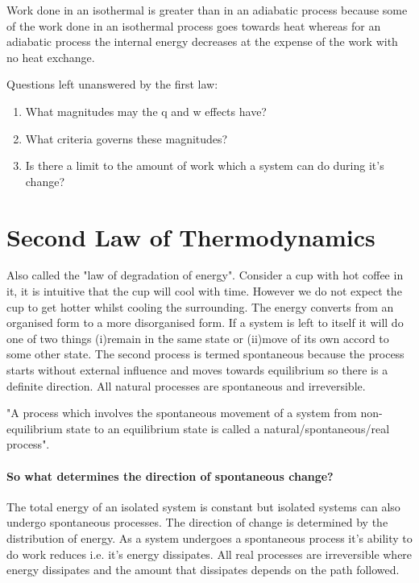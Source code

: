 \documentclass[12pt]{article}
\begin{document}
Work done in an isothermal is greater than in an adiabatic process because some of the work done in an isothermal process goes towards heat whereas for an adiabatic process the internal energy decreases at the expense of the work with no heat exchange. 

Questions left unanswered by the first law:
\begin{enumerate}
	\item What magnitudes may the q and w effects have?
	\item What criteria governs these magnitudes?
	\item Is there a limit to the amount of work which a system can do during it's change?
\end{enumerate}

\section{Second Law of Thermodynamics}
 Also called the "law of degradation of energy". Consider a cup with hot coffee in it, it is intuitive that the cup will cool with time. However we do not expect the cup to get hotter whilst cooling the surrounding. The energy converts from an organised form to a more disorganised form. If a system is left to itself it will do one of two things (i)remain in the same state or (ii)move of its own accord to some other state. The second process is termed  spontaneous because the process starts without external influence and moves towards equilibrium so there is a definite direction. All natural processes are spontaneous and irreversible.\\

\begin{center}
	{\color{red}"A process which involves the spontaneous movement of a system from non-equilibrium state to an equilibrium state is called a natural/spontaneous/real process".}
\end{center}
 
 \paragraph{So what determines the direction of spontaneous change?}
 The total energy of an isolated system is constant but isolated systems can also undergo spontaneous processes. The direction of change is determined by the distribution of energy. As a system undergoes a spontaneous process it's ability to do work reduces i.e. it's energy dissipates. All real processes are irreversible where energy dissipates and the amount that dissipates depends on the path followed. 
\end{document}

